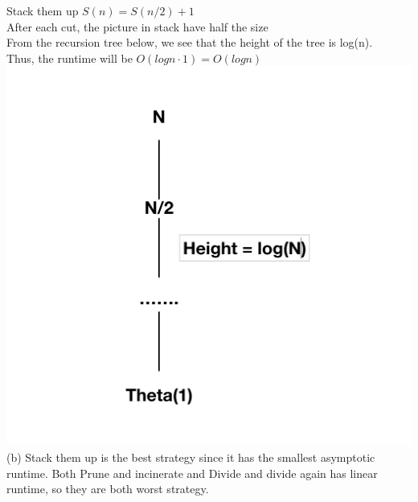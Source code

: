 \documentclass[12pt]{article}
\begin{document}
Stack them up $S(n) = S(n/2) + 1$\\
After each cut, the picture in stack have half the size\\
From the recursion tree below, we see that the height of the tree is log(n).\\
Thus, the runtime will be $O(logn \cdot 1) = O(logn)$ \\
\includegraphics[scale = 0.3]{2}
\\

(b) Stack them up is the best strategy since it has the smallest asymptotic runtime.
Both Prune and incinerate and Divide and divide again has linear runtime, so they are both worst strategy.
\end{document}
